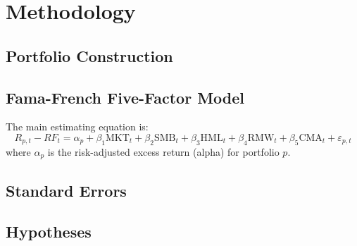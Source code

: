 \section{Methodology}
\label{sec:method}

\subsection{Portfolio Construction}
\label{sec:method-portfolios}


\subsection{Fama-French Five-Factor Model}
\label{sec:method-ff5}

The main estimating equation is:
\begin{equation}
  R_{p,t} - RF_t = \alpha_p + \beta_1 \mathrm{MKT}_t + \beta_2 \mathrm{SMB}_t
  + \beta_3 \mathrm{HML}_t + \beta_4 \mathrm{RMW}_t + \beta_5 \mathrm{CMA}_t
  + \varepsilon_{p,t}
  \label{eq:ff5}
\end{equation}
where $\alpha_p$ is the risk-adjusted excess return (alpha) for portfolio $p$.

\subsection{Standard Errors}
\label{sec:method-se}


\subsection{Hypotheses}
\label{sec:method-hyp}

